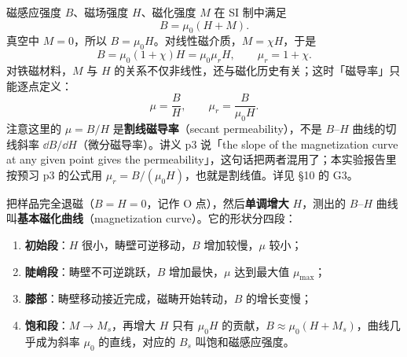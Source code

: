 \documentclass[11pt]{ctexart}
\begin{document}

磁感应强度 \(B\)、磁场强度 \(H\)、磁化强度 \(M\) 在 SI 制中满足
\[
B=\mu_0(H+M).
\]
真空中 \(M=0\)，所以 \(B=\mu_0H\)。对线性磁介质，\(M=\chi H\)，于是
\[
B=\mu_0(1+\chi)H=\mu_0\mu_rH,\qquad \mu_r=1+\chi.
\]
对铁磁材料，\(M\) 与 \(H\) 的关系不仅非线性，还与磁化历史有关；这时「磁导率」只能逐点定义：
\[
\mu=\frac{B}{H},\qquad \mu_r=\frac{B}{\mu_0H}.
\]
注意这里的 \(\mu=B/H\) 是\textbf{割线磁导率}（secant permeability），不是 \(B\)--\(H\) 曲线的切线斜率 \(\dd B/\dd H\)（微分磁导率）。讲义 p3 说「the slope of the magnetization curve at any given point gives the permeability」，这句话把两者混用了；本实验报告里按预习 p3 的公式用 \(\mu_r=B/(\mu_0H)\)，也就是割线值。详见 §10 的 G3。


把样品完全退磁（\(B=H=0\)，记作 O 点），然后\textbf{单调增大} \(H\)，测出的 \(B\)--\(H\) 曲线叫\textbf{基本磁化曲线}（magnetization curve）。它的形状分四段：

\begin{enumerate}
\item \textbf{初始段}：\(H\) 很小，畴壁可逆移动，\(B\) 增加较慢，\(\mu\) 较小；
\item \textbf{陡峭段}：畴壁不可逆跳跃，\(B\) 增加最快，\(\mu\) 达到最大值 \(\mu_{\max}\)；
\item \textbf{膝部}：畴壁移动接近完成，磁畴开始转动，\(B\) 的增长变慢；
\item \textbf{饱和段}：\(M\to M_s\)，再增大 \(H\) 只有 \(\mu_0H\) 的贡献，\(B\approx\mu_0(H+M_s)\)，曲线几乎成为斜率 \(\mu_0\) 的直线，对应的 \(B_s\) 叫饱和磁感应强度。
\end{enumerate}
\end{document}

